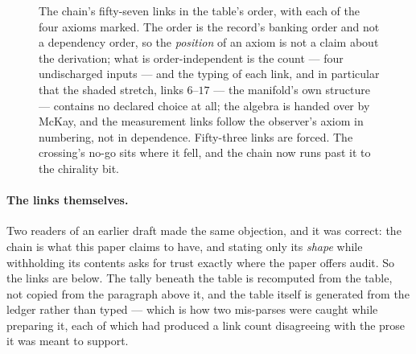 \documentclass[11pt,a4paper]{article}
\theoremstyle{definition}
\theoremstyle{remark}
\begin{document}
\begin{figure}[h]
\centering
{}
\caption{\small The chain's fifty-seven links in the table's order, with each of the four axioms marked. The order is the
record's banking order and not a dependency order, so the \emph{position} of an axiom is not a claim about the derivation; what
is order-independent is the count --- four undischarged inputs --- and the typing of each link, and in particular that the
shaded stretch, links $6$--$17$ --- the manifold's own structure --- contains no declared choice at all; the algebra is
handed over by McKay, and the measurement links follow the observer's axiom in numbering, not in dependence.
Fifty-three links are forced. The crossing's no-go sits where it fell, and the chain now runs past it to the
chirality bit.}
\label{fig:chain}
\end{figure}


\paragraph{The links themselves.} Two readers of an earlier draft made the same objection, and it
was correct: the chain is what this paper claims to have, and stating only its \emph{shape} while
withholding its contents asks for trust exactly where the paper offers audit. So the links are
below. The tally beneath the table is recomputed from the table, not copied from the paragraph
above it, and the table itself is generated from the ledger rather than typed --- which is how two
mis-parses were caught while preparing it, each of which had produced a link count disagreeing with
the prose it was meant to support.
\end{document}
